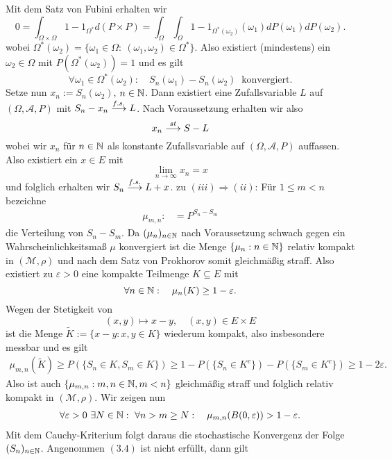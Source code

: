 \begin{proof*}
$$    $$
    Mit dem Satz von Fubini erhalten wir
    $$
        0 = \int_{\Omega \times \Omega}1 - 1_{\Omega^*} d(P \times P) = \int_{\Omega}\int_{\Omega}1 - 1_{\Omega^*(\omega_2)}(\omega_1)dP(\omega_1)dP(\omega_2). 
    $$
    wobei $\Omega^*(\omega_2) = \{\omega_1 \in \Omega: \ (\omega_1, \omega_2) \in \Omega^* \}$. Also existiert (mindestens) ein $\omega_2 \in \Omega$ mit $P(\Omega^*(\omega_2)) = 1$ und es gilt
    $$
        \forall \omega_1 \in \Omega^*(\omega_2): \quad S_n(\omega_1) - S_n(\omega_2) \ \text{ konvergiert.}
    $$
    Setze nun $x_n := S_n(\omega_2)$, $n \in \mathbb{N}$. Dann existiert eine Zufallsvariable $L$ auf $(\Omega, \mathcal{A}, P)$ mit $S_n - x_n \overset{f.s.}{\longrightarrow} L$. Nach Voraussetzung erhalten wir also 
    $$
        x_n \overset{st}{\longrightarrow} S - L
    $$
    wobei wir $x_n$ für $n \in \mathbb{N}$ als konstante Zufallsvariable auf $(\Omega, \mathcal{A}, P)$ auffassen. Also existiert ein $x \in E$ mit 
    $$
        \lim_{n \to \infty}x_n = x
    $$
    und folglich erhalten wir $S_n \overset{f.s.}{\longrightarrow} L + x$. 
    \newline 
    zu $(iii) \Rightarrow (ii)$: Für $1 \leq m < n$ bezeichne
    \begin{align*}
        \mu_{m,n} :&= P^{S_n - S_m}
    \end{align*}
    die Verteilung von $S_n - S_m$. Da $(\mu_n)_{n \in \mathbb{N}}$ nach Voraussetzung schwach gegen ein Wahrscheinlichkeitsmaß $\mu$ konvergiert
    ist die Menge $\{\mu_n: n \in \mathbb{N} \}$ relativ kompakt in $(\mathcal{M}, \rho)$ und nach dem Satz von Prokhorov somit gleichmäßig straff.
    Also existiert zu $\varepsilon > 0$ eine kompakte Teilmenge $K \subseteq E$ mit 
    $$
        \forall n \in \mathbb{N}: \quad \mu_n(K) \geq 1 - \varepsilon. 
    $$
    Wegen der Stetigkeit von 
    $$
        (x,y) \mapsto x - y, \quad (x,y) \in E \times E
    $$
    ist die Menge $\tilde{K} := \{x - y : x,y \in K \}$ wiederum kompakt, also insbesondere messbar und es gilt
    \begin{align*}
        \mu_{m,n}(\tilde{K}) \geq P(\{S_n \in K, S_m \in K\}) \geq 1 - P(\{S_n \in K^c\}) - P(\{S_m \in K^c\}) \geq 1 - 2\varepsilon.
    \end{align*}
    Also ist auch $\{\mu_{m,n}: m,n \in \mathbb{N}, m < n \}$ gleichmäßig straff und folglich relativ kompakt in $(\mathcal{M}, \rho)$. 
    Wir zeigen nun
    \begin{align}
        \forall \varepsilon > 0 \ \exists N \in \mathbb{N}: \ \forall n > m \geq N: \quad \mu_{m,n}(B(0,\varepsilon)) > 1 - \varepsilon.
    \end{align}
    Mit dem Cauchy-Kriterium folgt daraus die stochastische Konvergenz der Folge $(S_n)_{n \in \mathbb{N}}$. Angenommen $(3.4)$ ist nicht erfüllt, dann gilt

\end{proof*}
